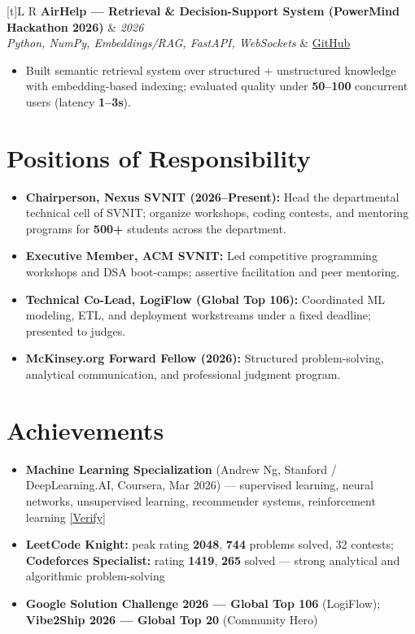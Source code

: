 \documentclass[a4paper,10pt]{article}
\newcommand{\resumeProject}[4]{%
  \vspace{0.3mm}
  \noindent
  \begin{tabularx}{\textwidth}[t]{L R}
    \textbf{#1} & \textit{#3} \\
    \textit{#2} & #4 \\
  \end{tabularx}
  \vspace{-0.3mm}%
}
\begin{document}
\resumeProject
  {AirHelp --- Retrieval \& Decision-Support System (PowerMind Hackathon 2026)}
  {Python, NumPy, Embeddings/RAG, FastAPI, WebSockets}
  {2026}
  {\href{https://github.com/Ojas-Srivastava05/AirHelp-AI-Airport-Assistant}{GitHub}}
\begin{itemize}
  \item Built semantic retrieval system over structured + unstructured knowledge with embedding-based indexing; evaluated quality under \textbf{50--100} concurrent users (latency \textbf{1--3s}).
\end{itemize}

\section{Positions of Responsibility}
\small
\begin{itemize}
  \item \textbf{Chairperson, Nexus SVNIT (2026--Present):} Head the departmental technical cell of SVNIT; organize workshops, coding contests, and mentoring programs for \textbf{500+} students across the department.
  \item \textbf{Executive Member, ACM SVNIT:} Led competitive programming workshops and DSA boot-camps; assertive facilitation and peer mentoring.
  \item \textbf{Technical Co-Lead, LogiFlow (Global Top 106):} Coordinated ML modeling, ETL, and deployment workstreams under a fixed deadline; presented to judges.
  \item \textbf{McKinsey.org Forward Fellow (2026):} Structured problem-solving, analytical communication, and professional judgment program.
\end{itemize}

\section{Achievements}
\small
\begin{itemize}
  \item \textbf{Machine Learning Specialization} (Andrew Ng, Stanford / DeepLearning.AI, Coursera, Mar 2026) --- supervised learning, neural networks, unsupervised learning, recommender systems, reinforcement learning \href{https://coursera.org/verify/specialization/L4B778ADFB7C}{[Verify]}
  \item \textbf{LeetCode Knight:} peak rating \textbf{2048}, \textbf{744} problems solved, 32 contests; \textbf{Codeforces Specialist:} rating \textbf{1419}, \textbf{265} solved --- strong analytical and algorithmic problem-solving
  \item \textbf{Google Solution Challenge 2026 --- Global Top 106} (LogiFlow); \textbf{Vibe2Ship 2026 --- Global Top 20} (Community Hero)
\end{itemize}
\end{document}
